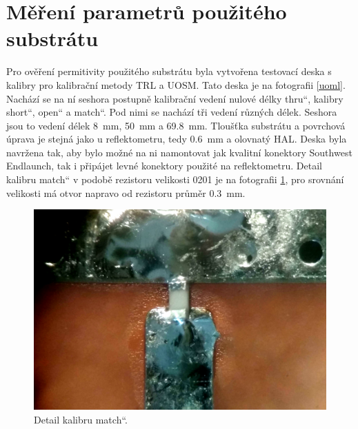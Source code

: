 \section{Měření parametrů použitého substrátu}
Pro ověření permitivity použitého substrátu byla vytvořena testovací deska s kalibry pro kalibrační metody \acrshort{TRL} a \acrshort{UOSM}. Tato deska je na fotografii \ref{uoml}. Nachází se na ní seshora postupně kalibrační vedení nulové délky \quotedblbase thru\textquotedblleft , kalibry \quotedblbase short\textquotedblleft , \quotedblbase open\textquotedblleft{} a \quotedblbase match\textquotedblleft{}. Pod nimi se nachází tři vedení různých délek. Seshora jsou to vedení délek \SI{8}{\milli\meter}, \SI{50}{\milli\meter} a \SI{69.8}{\milli\meter}. Tloušťka substrátu a povrchová úprava je stejná jako u reflektometru, tedy \SI{0.6}{\milli\meter} a olovnatý HAL. Deska byla navržena tak, aby bylo možné na ni namontovat jak kvalitní konektory Southwest Endlaunch, tak i připájet levné konektory použité na reflektometru. Detail kalibru \quotedblbase match\textquotedblleft{} v podobě rezistoru velikosti 0201 je na fotografii \ref{match_detail}, pro srovnání velikosti má otvor napravo od rezistoru průměr \SI{0.3}{\milli\meter}.
\begin{figure}[htbp]
\includegraphics[width=\textwidth,keepaspectratio]{images/measurements/match.jpg}\caption{Detail kalibru \quotedblbase match\textquotedblleft .}\label{match_detail}
\end{figure}

